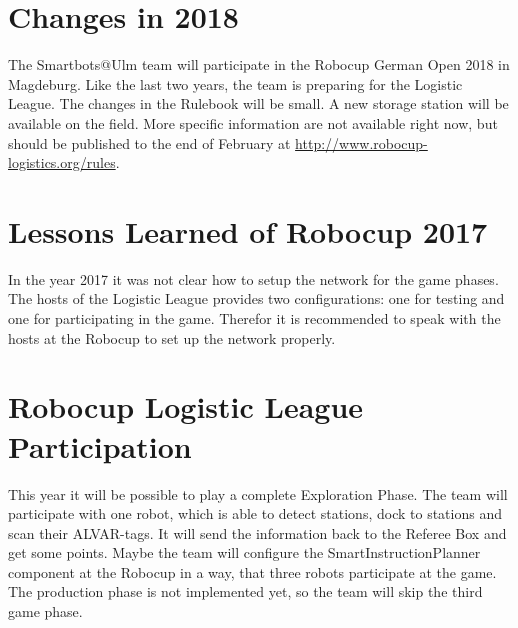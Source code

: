\section{Changes in 2018}

The Smartbots@Ulm team will participate in the Robocup German Open 2018 in Magdeburg. Like the last two years, the team is preparing for the Logistic League. The changes in the Rulebook will be small. A new storage station will be available on the field. More specific information are not available right now, but should be published to the end of February at \url{http://www.robocup-logistics.org/rules}.


\section{Lessons Learned of Robocup 2017}

In the year 2017 it was not clear how to setup the network for the game phases. The hosts of the Logistic League provides two configurations: one for testing and one for participating in the game. Therefor it is recommended to speak with the hosts at the Robocup to set up the network properly. 


\section{Robocup Logistic League Participation}

This year it will be possible to play a complete Exploration Phase. The team will participate with one robot, which is able to detect stations, dock to stations and scan their ALVAR-tags. It will send the information back to the Referee Box and get some points. Maybe the team will configure the SmartInstructionPlanner component at the Robocup in a way, that three robots  participate at the game.
The production phase is not implemented yet, so the team will skip the third game phase.
